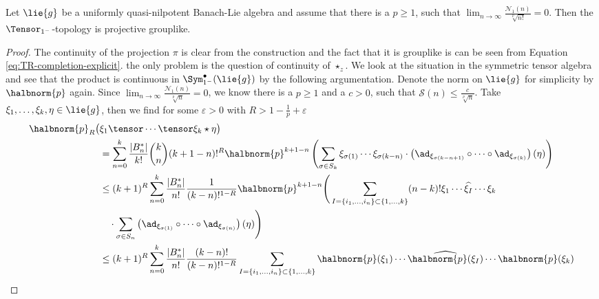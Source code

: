 \documentclass[
11pt,                          %
english                        %
]{article}
\begin{document}
\begin{proposition}
	\label{prop:mainthm_rev_1}
	Let $\lie{g}$ be a uniformly quasi-nilpotent Banach-Lie algebra and assume that 
	there is a $p \geq 1$, such that $\lim_{n \rightarrow \infty} 
	\frac{\mathcal{N}_1(n)}{\sqrt[p]{n!}} = 0$. Then the $\Tensor_{1^-}$-topology is 
	projective grouplike.
\end{proposition}
\begin{proof}
	The continuity of the projection $\pi$ is clear from the construction and the 
	fact that it is grouplike is can be seen from Equation 
	\eqref{eq:TR-completion-explicit}. the only problem is the question of 
	continuity of $\star_z$. We look at the situation in the symmetric tensor 
	algebra and see that the product is continuous in $\Sym_{1^-}^{\bullet}
	(\lie{g})$ by the following argumentation. Denote the norm on $\lie{g}$ 
	for simplicity by $\halbnorm{p}$ again. Since $\lim_{n \rightarrow \infty} 
	\frac{\mathcal{N}_1(n)}{\sqrt[p]{n}} = 0$, we know there is a $p \geq 1$ and a 
	$c > 0$, such that $\mathcal{S}(n) \leq \frac{c}{\sqrt[p]{n}}$. Take $\xi_1, 
	\ldots, \xi_k, \eta \in \lie{g}$, then we find for some $\varepsilon > 0$ with 
	$R > 1 - \frac{1}{p} + \varepsilon$
	\begin{align*}
		\halbnorm{p}_R \big(
		&
			\xi_1 \tensor \cdots \tensor \xi_k
			\star
			\eta
		\big)
		\\
		&=
		\sum\limits_{n = 0}^k
		\frac{|B_n^*|}{k!} \binom{k}{n}
		(k + 1 - n)!^R
		\halbnorm{p}^{k+1-n}
		\left(
			\sum	\limits_{\sigma \in S_k}
			\xi_{\sigma(1)} \cdots \xi_{\sigma(k-n)}
			\cdot
			\left( 
				\ad_{\xi_{\sigma(k-n+1)}} 
				\circ \cdots \circ
				\ad_{\xi_{\sigma(k)}}
			\right)
			(\eta)
		\right)
		\\
		& \leq
		(k + 1)^R
		\sum\limits_{n = 0}^k
		\frac{|B_n^*|}{n!}
		\frac{1}{(k-n)!^{1 - R}}
		\halbnorm{p}^{k+1-n}
		\Bigg(
			\sum\limits_{
				I = \{i_1, \ldots, i_n\} \subset \{1, \ldots, k\}
			}
			(n-k)!
			\xi_1 \cdots \widehat{\xi_I} \cdots \xi_k
		\\
		& \quad \cdot
			\sum	\limits_{\sigma \in S_n}
			\left( 
				\ad_{\xi_{\sigma(1)}} 
				\circ \cdots \circ
				\ad_{\xi_{\sigma(n)}}
			\right)
			(\eta)
		\Bigg)
		\\
		& \leq
		(k + 1)^R
		\sum\limits_{n = 0}^k
		\frac{|B_n^*|}{n!}
		\frac{(k-n)!}{(k-n)!^{1 - R}}
		\sum\limits_{
			I = \{i_1, \ldots, i_n\} \subset \{1, \ldots, k\}
		}
		\halbnorm{p}(\xi_1) 
		\cdots \widehat{\halbnorm{p}(\xi_I)} \cdots 
		\halbnorm{p}(\xi_k)
		\\

\end{align*}
\end{proof}
\end{document}
